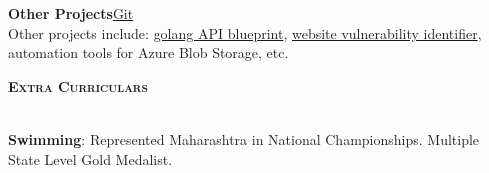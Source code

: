 \documentclass[a4paper]{article}
\newcommand{\lineunder} {
\vspace*{-8pt} \\
\hspace*{-18pt} \hrulefill \\
}
\newcommand{\header}[1]{%
{\hspace*{-18pt}\vspace*{6pt} \textsc{\textbf{\Large{#1}}}}%
\vspace*{-6pt} \lineunder
}
\begin{document}

{\textbf{Other Projects}\hfill \href{https://github.com/swarnimcodes/}{Git}} \\
Other projects include: 
\href{https://github.com/swarnimcodes/apigo}{golang API blueprint},
\href{https://github.com/swarnimcodes/website-security-checker}{website vulnerability identifier},
automation tools for Azure Blob Storage, etc.
\vspace{2mm}


\vspace{2mm}
\header{Extra Curriculars}
\vspace{1mm}

\textbf{Swimming}: Represented Maharashtra in National Championships. Multiple State Level Gold Medalist.
\end{document}
